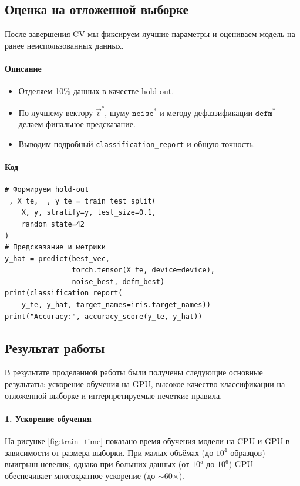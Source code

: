 \subsection{Оценка на отложенной выборке}

После завершения CV мы фиксируем лучшие параметры и оцениваем модель на ранее неиспользованных данных.

\paragraph{Описание}  
\begin{itemize}
  \item Отделяем 10\% данных в качестве hold-out.
  \item По лучшему вектору \(\vec v^*\), шуму \(\texttt{noise}^*\) и методу дефаззификации \(\texttt{defm}^*\) делаем финальное предсказание.
  \item Выводим подробный \texttt{classification\_report} и общую точность.
\end{itemize}

\paragraph{Код}  
\begin{verbatim}
# Формируем hold-out
_, X_te, _, y_te = train_test_split(
    X, y, stratify=y, test_size=0.1,
    random_state=42
)
# Предсказание и метрики
y_hat = predict(best_vec,
                torch.tensor(X_te, device=device),
                noise_best, defm_best)
print(classification_report(
    y_te, y_hat, target_names=iris.target_names))
print("Accuracy:", accuracy_score(y_te, y_hat))
\end{verbatim}

\subsection{Результат работы}

В результате проделанной работы были получены следующие основные результаты: ускорение обучения на GPU, высокое качество классификации на отложенной выборке и интерпретируемые нечеткие правила.

\paragraph{1. Ускорение обучения}  
На рисунке \ref{fig:train_time} показано время обучения модели на CPU и GPU в зависимости от размера выборки. При малых объёмах (до $10^4$ образцов) выигрыш невелик, однако при больших данных (от $10^5$ до $10^6$) GPU обеспечивает многократное ускорение (до $\sim$60×).

